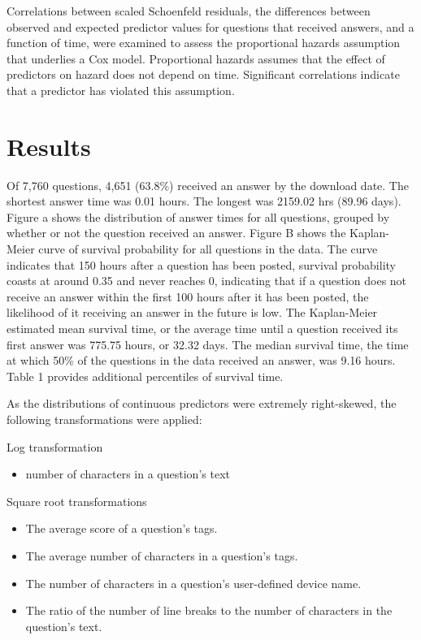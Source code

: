\documentclass[12pt]{article}
\begin{document}
Correlations between scaled Schoenfeld residuals, the differences between observed and expected predictor values for questions that received answers, and a function of time, were examined to assess the proportional hazards assumption that underlies a Cox model. Proportional hazards assumes that the effect of predictors on hazard does not depend on time. Significant correlations indicate that a predictor has violated this assumption. 


\section{Results} 

  Of 7,760 questions, 4,651 (63.8\%) received an answer by the download date. The shortest answer time was 0.01 hours. The longest was 2159.02 hrs (89.96 days). Figure a shows the distribution of answer times for all questions, grouped by whether or not the question received an answer. Figure B shows the Kaplan-Meier curve of survival probability for all questions in the data. The curve indicates that 150 hours after a question has been posted, survival probability coasts at around 0.35 and never reaches 0, indicating that if a question does not receive an answer within the first 100 hours after it has been posted, the likelihood of it receiving an answer in the future is low. The Kaplan-Meier estimated mean survival time, or the average time until a question received its first answer was 775.75 hours, or 32.32 days. The median survival time, the time at which 50\% of the questions in the data received an answer, was 9.16 hours. Table 1 provides additional percentiles of survival time. 

As the distributions of continuous predictors were extremely right-skewed, the following transformations were applied: 

Log transformation
\begin{itemize}
  \item number of characters in a question's text
\end{itemize}

Square root transformations
\begin{itemize}
  \item The average score of a question's tags.
  \item The average number of characters in a question's tags.
  \item The number of characters in a question's user-defined device name.
  \item The ratio of the number of line breaks to the number of characters in the question's text.
\end{itemize}
\end{document}
